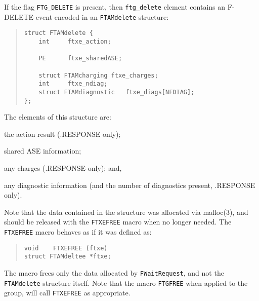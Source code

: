 If the flag \verb"FTG_DELETE" is present,
then \verb"ftg_delete" element contains an {\sf F-DELETE\/} event encoded in an
\verb"FTAMdelete" structure:
\begin{quote}\small\begin{verbatim}
struct FTAMdelete {
    int     ftxe_action;
    
    PE      ftxe_sharedASE;

    struct FTAMcharging ftxe_charges;
    int     ftxe_ndiag;
    struct FTAMdiagnostic   ftxe_diags[NFDIAG];
};
\end{verbatim}\end{quote}
The elements of this structure are:
\begin{describe}
\item[\verb"ftxe\_action":] the action result ({\sf .RESPONSE\/} only);

\item[\verb"ftxe\_sharedASE":] shared ASE information;

\item[\verb"ftxe\_charges":] any charges ({\sf .RESPONSE\/} only);
and,

\item[\verb"ftxe\_diags"/\verb"ftxe\_ndiag":] any diagnostic information
(and the number of diagnostics present, {\sf .RESPONSE\/} only).
\end{describe}
Note that the data contained in the structure was allocated via \man malloc(3),
and should be released with the \verb"FTXEFREE" macro when no longer needed.
The \verb"FTXEFREE" macro
behaves as if it was defined as:
\begin{quote}\small\begin{verbatim}
void    FTXEFREE (ftxe)
struct FTAMdeltee *ftxe;
\end{verbatim}\end{quote}
The macro frees only the data allocated by \verb"FWaitRequest",
and not the \verb"FTAMdelete" structure itself.
Note that the macro \verb"FTGFREE" when applied to the group,
will call \verb"FTXEFREE" as appropriate.

